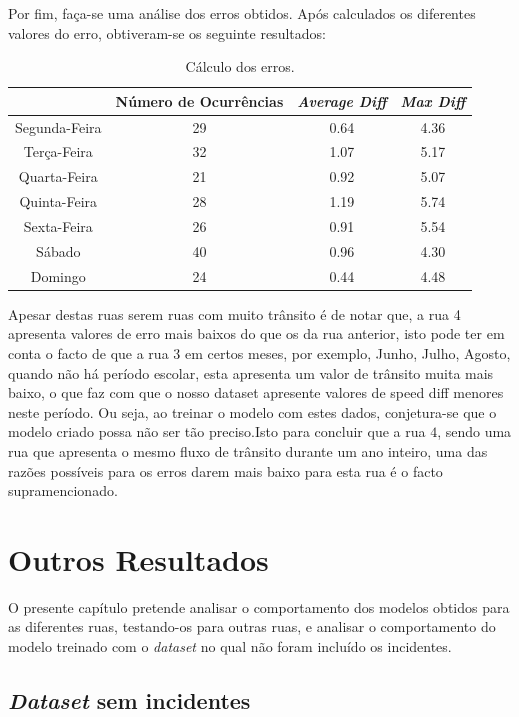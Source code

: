 \documentclass[a4paper, 12pt]{article}
\begin{document}
Por fim, faça-se uma análise dos erros obtidos. Após calculados os diferentes valores do erro, obtiveram-se os seguinte resultados:

\begin{table}[H]
	\centering
	\begin{tabular}{||c||c|c|c||}
		\hline\hline
		&Número de Ocurrências& \textit{Average Diff} & \textit{Max Diff} \\
		\hline\hline
		 Segunda-Feira & 29&
0.64
 & 4.36\\
		\hline
		 Terça-Feira  &32&
1.07
 & 5.17 \\
		\hline
		 Quarta-Feira & 21&
0.92
 & 5.07 \\
		\hline
		 Quinta-Feira  & 28&
1.19
 & 5.74 \\
		\hline
		 Sexta-Feira & 26&0.91
 & 5.54\\
		\hline
		 Sábado  &40& 0.96
& 4.30 \\
		\hline
		 Domingo & 24&
0.44
 & 4.48
 \\
		\hline\hline
	\end{tabular}
	\label{table:rua4}
	\caption{Cálculo dos erros.}
\end{table}

Apesar destas ruas serem ruas com muito trânsito é de notar que, a rua 4 apresenta valores de erro mais baixos do que os da rua anterior, isto pode ter em conta o facto de que a rua 3 em certos meses, por exemplo, Junho, Julho, Agosto, quando não há período escolar, esta apresenta um valor de trânsito muita mais baixo, o que faz com que o nosso dataset apresente valores de speed diff menores neste período. Ou seja, ao treinar o modelo com estes dados, conjetura-se que o modelo criado possa não ser tão preciso.Isto para concluir que a rua $4$, sendo uma rua que apresenta o mesmo fluxo de trânsito durante um ano inteiro, uma das razões possíveis para os erros darem mais baixo para esta rua é o facto supramencionado.

\section{Outros Resultados}

O presente capítulo pretende analisar o comportamento dos modelos obtidos para as diferentes ruas, testando-os para outras ruas, e analisar o comportamento do modelo treinado com o \textit{dataset} no qual não foram incluído os incidentes.

\subsection{\textit{Dataset} sem incidentes}
\end{document}
